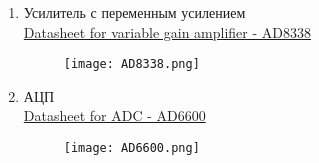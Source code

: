 \documentclass[a4paper,12pt]{article}
\begin{document}
\begin{enumerate}
\newpage

\item  Усилитель с переменным усилением \\
\href{https://www.alldatasheet.com/datasheet-pdf/view/513439/AD/AD8338.html}{Datasheet for variable gain amplifier - AD8338}
\begin{figure}[H]
    \centering
    \texttt{[image: AD8338.png]}
    \label{fig:enter-label}
\end{figure}

\newpage

\item  АЦП \\
\href{https://www.alldatasheet.com/datasheet-pdf/view/48122/AD/AD6600.html}{Datasheet for ADC - AD6600}
\begin{figure}[H]
    \centering
    \texttt{[image: AD6600.png]}
    \label{fig:enter-label}
\end{figure}

\newpage



\end{enumerate}
\end{document}
